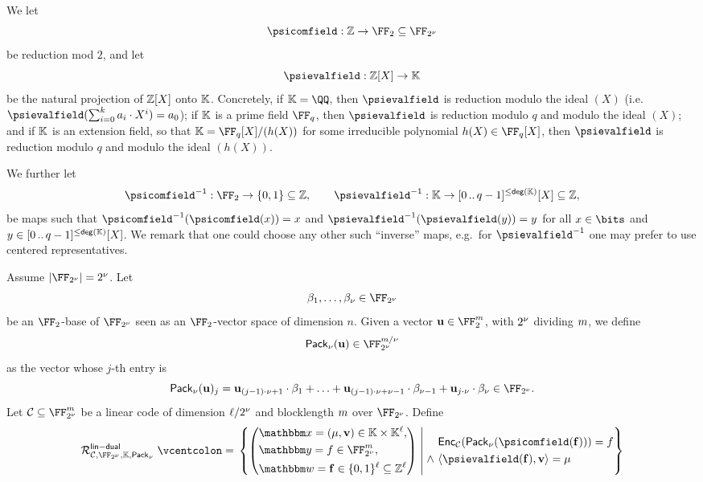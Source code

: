 \documentclass[11pt,letterpaper,usenames,dvipsnames]{article}
\begin{document}
We let
%
$$
\psicomfield : \ZZ \to \FF_2 \subseteq \comfield
$$
be reduction mod $2$, and let 
%
$$
\psievalfield: \ZZ[X] \to \KK
$$
%
be the natural projection of $\mathbb{Z}[X]$ onto $\mathbb{K}$. Concretely, if $\KK=\QQ$,  then  $\psievalfield$ is reduction modulo the ideal $(X)$ (i.e.\ $\psievalfield(\sum_{i=0}^{k} a_i\cdot X^i)  = a_0$);  if $\mathbb{K}$ is a prime field $\FF_q$, then $\psievalfield$ is reduction modulo $q$ and modulo the ideal $(X)$; and if $\mathbb{K}$ is an extension field, so that $\KK=\FF_q[X]/(h(X))$ for some irreducible polynomial $h(X)\in \FF_q[X]$, then $\psievalfield$ is reduction modulo $q$ and modulo the ideal $(h(X))$.

We further let 
$$
\psicomfield^{-1} : \FF_2 \to \{0,1\} \subseteq \ZZ, \qquad \psievalfield^{-1}: \KK \to \range{0}{q-1}^{\leq\degevalfield}[X] \subseteq \ZZ,
$$
be maps such that $\psicomfield^{-1}(\psicomfield(x))=x$ and $\psievalfield^{-1}(\psievalfield(y))=y$ for all $x\in\bits$ and $y\in [0 \, .. \, q-1]^{\leq\mathsf{deg}(\mathbb{K})}[X]$. We remark that one could choose any other such ``inverse'' maps, e.g.\ for $\psievalfield^{-1}$ one may prefer to use centered representatives. 



Assume $|\comfield|=2^\comfieldexp$. Let
%
$$
\beta_1, \ldots, \beta_\comfieldexp \in \comfield
$$
%
be an $\FF_2$-base of $\comfield$ seen as an $\FF_2$-vector space of dimension $n$. Given a vector $\uu\in \FF_2^\codelength$, with $2^\nu$ dividing $m$, we define
%
$$
\pack(\uu)\in \comfield^{\codelength/\comfieldexp}
$$
as the vector whose $j$-th entry is
%
$$
\pack(\uu)_{j} = \uu_{(j-1)\cdot \comfieldexp +1 }\cdot \beta_1 + \ldots + \uu_{(j-1)\cdot \comfieldexp +\comfieldexp-1 }\cdot \beta_{\comfieldexp-1}+\uu_{j \cdot \comfieldexp} \cdot \beta_\comfieldexp \in \comfield.
$$
%
%
Let $\cC\subseteq \comfield^{\codelength}$ be a linear code of dimension $\ell/2^{\nu}$ and blocklength $m$ over $\comfield$. Define 
$$
\Relation^{\mathsf{lin-dual}}_{\cC,\comfield, \evalfield,\pack} \defeq \left\{ \left(\begin{aligned} &\inp=(\mu, \vv)\in \evalfield \times \evalfield^{\codedim}, \\&\oracle = f \in \comfield^\codelength, \\ &\wit= \bff\in \{0,1\}^\codedim \subseteq \ZZ^\codedim\end{aligned}\right) \;\middle|\;  \begin{aligned} &\Enc_{\cC}(\pack(\psicomfield(\bff))) = f\\ \wedge \  & \langle \psievalfield(\bff), \vv\rangle  = \mu  \end{aligned} \right\}
$$
%
\end{document}
